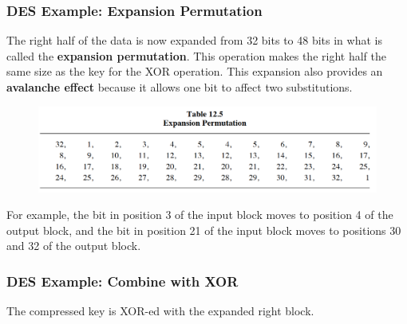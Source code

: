 \documentclass{beamer}
\newcommand{\<}{\langle}
\renewcommand{\>}{\rangle}
\begin{document}
\begin{frame}
\frametitle{DES Example: Expansion Permutation}

The right half of the data is now expanded from 32 bits to 48 bits in what is called the \textbf{expansion permutation}. This operation makes the right half the same size as the key for the XOR operation. This expansion also provides an \textbf{avalanche effect} because it allows one bit to affect two substitutions.

\begin{figure}
\includegraphics[scale=.5]{IMG/ex5}
\end{figure}

For example, the bit in position 3 of the input block moves to
position 4 of the output block, and the bit in position 21 of the input block moves to positions 30 and 32 of the output block.
\end{frame}



\begin{frame}
\frametitle{DES Example: Combine with XOR}

The compressed key is XOR-ed with the expanded right block.
\end{frame}
\end{document}
